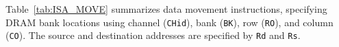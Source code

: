 
Table~\ref{tab:ISA_MOVE} summarizes \att{} data movement instructions,
specifying DRAM bank locations using channel (\texttt{CHid}), bank (\texttt{BK}), row (\texttt{RO}), and column (\texttt{CO}).
The source and destination \rf{} addresses are specified by \texttt{Rd} and \texttt{Rs}.

